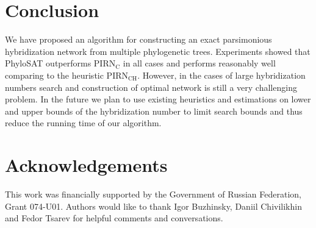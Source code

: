 \documentclass[runningheads, envcountsame, a4paper]{llncs}
\begin{document}
\section{Conclusion}

We have proposed an algorithm for constructing an exact parsimonious hybridization network from multiple phylogenetic trees.
Experiments showed that PhyloSAT outperforms PIRN$\mathrm{_C}$ in all cases and performs reasonably well comparing 
to the heuristic PIRN$\mathrm{_{CH}}$. 
However, in the cases of large hybridization numbers search and construction of optimal network is still a very challenging problem. 
In the future we plan to use existing heuristics and estimations on lower and upper bounds of the hybridization number to 
limit search bounds and thus reduce the running time of our algorithm.

\section*{Acknowledgements}

This work was financially supported by the Government of Russian Federation, Grant 074-U01. Authors would like to thank Igor Buzhinsky, Daniil Chivilikhin and Fedor Tsarev for helpful comments and conversations.



\clearpage
\end{document}
